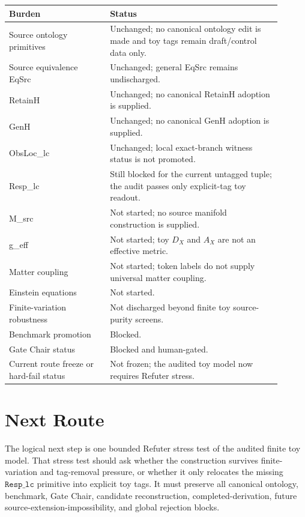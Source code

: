 \documentclass[11pt]{article}
\begin{document}
\begin{center}
\begin{tabular}{p{0.33\linewidth}p{0.57\linewidth}}
\hline
Burden & Status \\
\hline
Source ontology primitives & Unchanged; no canonical ontology edit is made and toy tags remain draft/control data only. \\
Source equivalence EqSrc & Unchanged; general EqSrc remains undischarged. \\
RetainH & Unchanged; no canonical RetainH adoption is supplied. \\
GenH & Unchanged; no canonical GenH adoption is supplied. \\
ObsLoc\_lc & Unchanged; local exact-branch witness status is not promoted. \\
Resp\_lc & Still blocked for the current untagged tuple; the audit passes only explicit-tag toy readout. \\
M\_src & Not started; no source manifold construction is supplied. \\
g\_eff & Not started; toy \(D_X\) and \(A_X\) are not an effective metric. \\
Matter coupling & Not started; token labels do not supply universal matter coupling. \\
Einstein equations & Not started. \\
Finite-variation robustness & Not discharged beyond finite toy source-purity screens. \\
Benchmark promotion & Blocked. \\
Gate Chair status & Blocked and human-gated. \\
Current route freeze or hard-fail status & Not frozen; the audited toy model now requires Refuter stress. \\
\hline
\end{tabular}
\end{center}

\section{Next Route}

The logical next step is one bounded Refuter stress test of the audited
finite toy model. That stress test should ask whether the construction
survives finite-variation and tag-removal pressure, or whether it only
relocates the missing \(\texttt{Resp\_lc}\) primitive into explicit toy
tags. It must preserve all canonical ontology, benchmark, Gate Chair,
candidate reconstruction, completed-derivation, future
source-extension-impossibility, and global rejection blocks.
\end{document}
